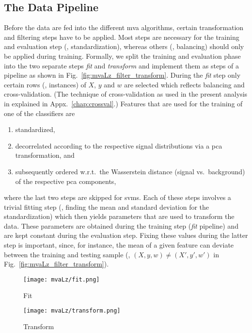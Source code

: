 \subsection{The Data Pipeline}
\label{sec:mvaLz_datapipeline}
Before the data are fed into the different \gls{mva} algorithms, certain transformation and filtering steps have to be applied.
Most steps are necessary for the training and evaluation step (\eg{}, standardization), whereas others (\eg{}, balancing) should only be applied during training.
Formally, we split the training and evaluation phase into the two separate steps \textit{fit} and \textit{transform} and implement them as steps of a pipeline as shown in Fig.~\ref{fig:mvaLz_filter_transform}.
During the \textit{fit} step only certain rows (\ie{}, instances) of $X$, $y$ and $w$ are selected which reflects balancing and cross-validation.
(The technique of cross-validation as used in the present analysis in explained in Appx.~\ref{chap:crossval}.)
Features that are used for the training of one of the classifiers are 
\begin{enumerate}[itemsep=2pt,parsep=2pt]
    \item standardized,
    \item decorrelated according to the respective signal distributions via a \gls{pca} transformation, and
    \item subsequently ordered w.r.t.\ the Wasserstein distance (signal vs.\ background) of the respective \gls{pca} components,
\end{enumerate}
where the last two steps are skipped for \glspl{svm}.
Each of these steps involves a trivial fitting step (\eg{}, finding the mean and standard deviation for the standardization) which then yields parameters that are used to transform the data.
These parameters are obtained during the training step (\textit{fit} pipeline) and are kept constant during the evaluation step.
Fixing these values during the latter step is important, since, for instance, the mean of a given feature can deviate between the training and testing sample (\ie{}, $(X,y,w) \neq (X',y',w')$ in Fig.~\ref{fig:mvaLz_filter_transform}).
\begin{sidewaysfigure}[htbp]
    \centering
    \begin{subfigure}{\textwidth}
        \centering
        \texttt{[image: mvaLz/fit.png]}
        \caption{Fit}
    \end{subfigure}
    \par\bigskip 
    \begin{subfigure}{\textwidth}
        \centering
        \texttt{[image: mvaLz/transform.png]}
        \caption{Transform}
    \end{subfigure}
    \caption{Fit and transform step as described in Sec.~\ref{sec:mvaLz_datapipeline}. The former fits parameters of various transform steps (\eg{}, \textit{Transform \#1}) which are fixed during evaluation of the latter.}
    \label{fig:mvaLz_filter_transform}
\end{sidewaysfigure}

